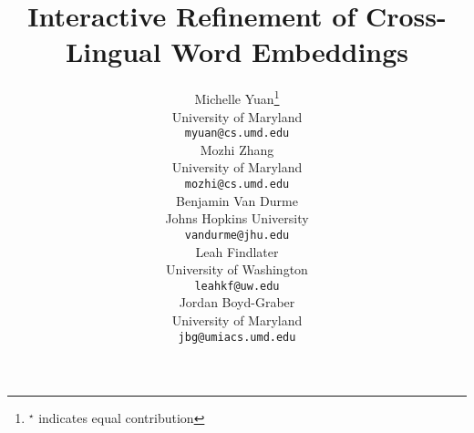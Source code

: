 \documentclass[11pt,a4paper]{article}
\title{Interactive Refinement of Cross-Lingual Word Embeddings}
\author{
    Michelle Yuan\thanks{$^{\star}$ indicates equal contribution} \\
    University of Maryland \\
    {\tt myuan@cs.umd.edu} \\\And
    Mozhi Zhang\footnotemark[1] \\
    University of Maryland\\
    {\tt mozhi@cs.umd.edu} \\\And
    Benjamin Van Durme \\
    Johns Hopkins University \\
    {\tt vandurme@jhu.edu} \\\AND
    Leah Findlater \\
    University of Washington\\
    {\tt leahkf@uw.edu} \\\And
    Jordan Boyd-Graber \\
    University of Maryland \\
    {\tt jbg@umiacs.umd.edu} \\
}
\newcommand{\latexfile}[1]{}
\begin{document}
\maketitle
\begin{abstract}
    \latexfile{00-abstract}
\end{abstract}

\latexfile{10-intro}
\latexfile{20-ui}
\latexfile{30-update}
\latexfile{40-cldc}
\latexfile{50-related}
\latexfile{60-conclusion}
\latexfile{70-acknowledgments}




\latexfile{appendix}
\end{document}
